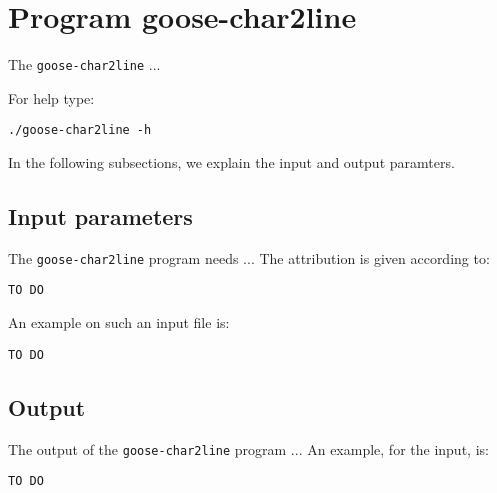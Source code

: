 \section{Program goose-char2line}
The \texttt{goose-char2line} ...

For help type:
\begin{lstlisting}
./goose-char2line -h
\end{lstlisting}
In the following subsections, we explain the input and output paramters.

\subsection*{Input parameters}

The \texttt{goose-char2line} program needs ...
The attribution is given according to:
\begin{lstlisting}
TO DO
\end{lstlisting}

An example on such an input file is:
\begin{lstlisting}
TO DO
\end{lstlisting}

\subsection*{Output}
The output of the \texttt{goose-char2line} program ...
An example, for the input, is:
\begin{lstlisting}
TO DO
\end{lstlisting}